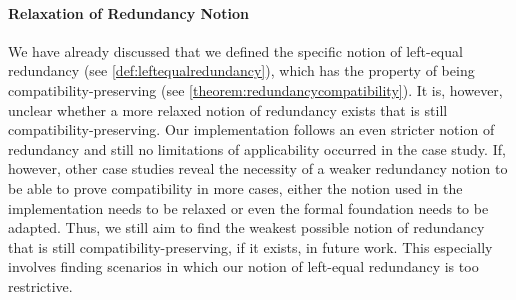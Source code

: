 \paragraph{Relaxation of Redundancy Notion}
We have already discussed that we defined the specific notion of left-equal redundancy (see \autoref{def:leftequalredundancy}), which has the property of being compatibility-preserving (see \autoref{theorem:redundancycompatibility}).
It is, however, unclear whether a more relaxed notion of redundancy exists that is still compatibility-preserving.
Our implementation follows an even stricter notion of redundancy and still no limitations of applicability occurred in the case study.
If, however, other case studies reveal the necessity of a weaker redundancy notion to be able to prove compatibility in more cases, either the notion used in the implementation needs to be relaxed or even the formal foundation needs to be adapted.
Thus, we still aim to find the weakest possible notion of redundancy that is still compatibility-preserving, if it exists, in future work.
This especially involves finding scenarios in which our notion of left-equal redundancy is too restrictive.



